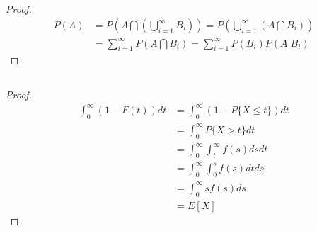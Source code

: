 \documentclass[runningheads]{llncs}
\begin{document}
    \subsection{}
    \begin{proof}
        \begin{align}
            P(A) &= P(A \bigcap (\bigcup_{i=1}^\infty B_i)) 
            = P(\bigcup_{i=1}^\infty (A \bigcap B_i)) \\
            &= \sum_{i=1}^\infty P(A \bigcap B_i)
            = \sum_{i=1}^\infty P(B_i) P(A | B_i)
        \end{align}
    \end{proof}
    \subsection{}
    \begin{proof}
        \begin{align}
            \int_0^\infty (1 - F(t))dt &= \int_0^\infty (1 - P\{ X \leq t \})dt \\
            &= \int_0^\infty P \{ X > t \}dt \\
            &= \int_0^\infty \int_t^\infty f(s)dsdt \\
            &= \int_0^\infty \int_0^s f(s) dt ds \\
            &= \int_0^\infty s f(s) ds \\
            &= E[X]
        \end{align}
    \end{proof}
\end{document}
